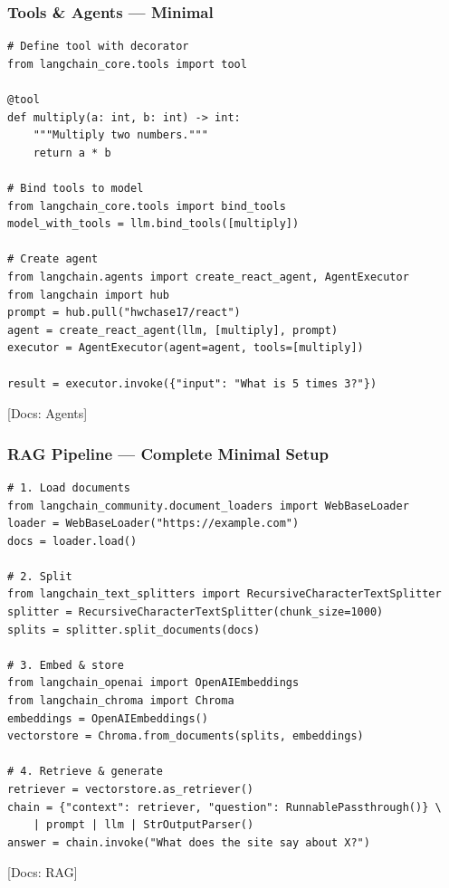 \documentclass[aspectratio=169,11pt]{beamer}
\newcommand{\docref}[1]{{\scriptsize\color{docgray}[Docs: #1]}}
\begin{document}
\begin{frame}[fragile]
  \frametitle{Tools \& Agents — Minimal}

  \begin{lstlisting}
# Define tool with decorator
from langchain_core.tools import tool

@tool
def multiply(a: int, b: int) -> int:
    """Multiply two numbers."""
    return a * b

# Bind tools to model
from langchain_core.tools import bind_tools
model_with_tools = llm.bind_tools([multiply])

# Create agent
from langchain.agents import create_react_agent, AgentExecutor
from langchain import hub
prompt = hub.pull("hwchase17/react")
agent = create_react_agent(llm, [multiply], prompt)
executor = AgentExecutor(agent=agent, tools=[multiply])

result = executor.invoke({"input": "What is 5 times 3?"})
  \end{lstlisting}

  \docref{Agents}
\end{frame}

\begin{frame}[fragile]
  \frametitle{RAG Pipeline — Complete Minimal Setup}

  \begin{lstlisting}
# 1. Load documents
from langchain_community.document_loaders import WebBaseLoader
loader = WebBaseLoader("https://example.com")
docs = loader.load()

# 2. Split
from langchain_text_splitters import RecursiveCharacterTextSplitter
splitter = RecursiveCharacterTextSplitter(chunk_size=1000)
splits = splitter.split_documents(docs)

# 3. Embed & store
from langchain_openai import OpenAIEmbeddings
from langchain_chroma import Chroma
embeddings = OpenAIEmbeddings()
vectorstore = Chroma.from_documents(splits, embeddings)

# 4. Retrieve & generate
retriever = vectorstore.as_retriever()
chain = {"context": retriever, "question": RunnablePassthrough()} \
    | prompt | llm | StrOutputParser()
answer = chain.invoke("What does the site say about X?")
  \end{lstlisting}

  \docref{RAG}
\vspace{-0.2cm}
\end{frame}
\end{document}
